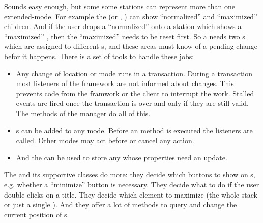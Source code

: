 Sounds easy enough, but some some stations can represent more than one extended-mode. For example the  (or , \linebreak {}) can show ``normalized'' and ``maximized'' children. And if the user drops a ``normalized''  onto a station which shows a ``maximized'' , then the ``maximized''  needs to be reset first. So a  needs two s which are assigned to different s, and these areas must know of a pending change befor it happens. There is a set of tools to handle these jobs:
\begin{itemize}
 \item Any change of location or mode runs in a transaction. During a transaction most listeners of the framework are not informed about changes. This prevents code from the framwork or the client to interrupt the work. Stalled events are fired once the transaction is over and only if they are still valid. The  methods of the manager do all of this.
 \item {}s can be added to any mode. Before an  method is executed the listeners are called. Other modes may act before or cancel any action.
 \item And the  can be used to store any  whose properties need an update.
\end{itemize}

The  and its supportive classes do more: they decide which buttons to show on s, e.g. whether a ``minimize'' button is necessary. They decide what to do if the user double-clicks on a title. They decide which element to maximize (the whole stack or just a single ). And they offer a lot of methods to query and change the current position of s.


